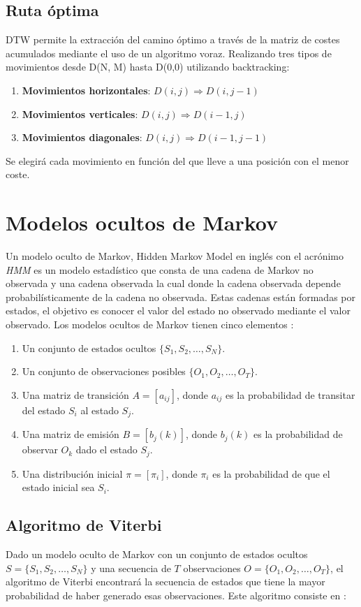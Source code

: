 \subsection{Ruta óptima}
DTW permite la extracción del camino óptimo a través de la matriz de costes acumulados mediante el uso de un algoritmo voraz. Realizando tres tipos de movimientos desde D(N, M) hasta D(0,0) utilizando backtracking:
\begin{enumerate}
	\item \textbf{Movimientos horizontales}: $D(i,j)\Longrightarrow D(i, j-1) $
	\item \textbf{Movimientos verticales}: $D(i,j)\Longrightarrow D(i-1, j) $
	\item \textbf{Movimientos diagonales}: $D(i,j)\Longrightarrow D(i-1, j-1) $
\end{enumerate}
Se elegirá cada movimiento en función del que lleve a una posición con el menor coste. 

\section{Modelos ocultos de Markov}
Un modelo oculto de Markov, Hidden Markov Model en inglés con el acrónimo \textit{HMM} es un modelo estadístico que consta de una cadena de Markov no observada y una cadena observada la cual donde la cadena observada depende probabilísticamente de la cadena no observada. Estas cadenas están formadas por estados, el objetivo es conocer el valor del estado no observado mediante el valor observado. Los modelos ocultos de Markov tienen cinco elementos \cite{99324907003}:
\begin{enumerate}
	\item Un conjunto de estados ocultos $\{S_1, S_2, \ldots, S_N\}$.
	\item Un conjunto de observaciones posibles $\{O_1, O_2, \ldots, O_T\}$.
	\item Una matriz de transición $A = [a_{ij}]$, donde $a_{ij}$ es la probabilidad de transitar del estado $S_i$ al estado $S_j$.
	\item Una matriz de emisión $B = [b_j(k)]$, donde $b_j(k)$ es la probabilidad de observar $O_k$ dado el estado $S_j$.
	\item Una distribución inicial $\pi = [\pi_i]$, donde $\pi_i$ es la probabilidad de que el estado inicial sea $S_i$.
\end{enumerate}

\subsection{Algoritmo de Viterbi}
Dado un modelo oculto de Markov con un conjunto de estados ocultos $S= \{S_1, S_2, \ldots, S_N\}$ y una secuencia de $T$ observaciones $O =\{O_1, O_2, \ldots, O_T\}$, el algoritmo de Viterbi encontrará la secuencia de estados que tiene la mayor probabilidad de haber generado esas observaciones. Este algoritmo consiste en \cite{algoViterbi, algoViterbi2}:

